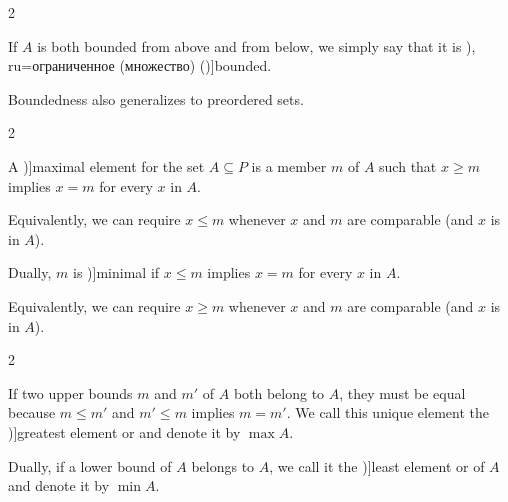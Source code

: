 \begin{definition}
\begin{thmenum}
\begin{paracol}{2}
\begin{rightcolumn}
        If \( A \) is both bounded from above and from below, we simply say that it is \term[bg=ограничено (множество) (\cite[19]{Тагамлицки1971ДиференциалноСмятане}), ru=ограниченное (множество) (\cite[39]{Зорич2019АнализЧасть1})]{bounded}.

        Boundedness also generalizes to preordered sets.
      \end{rightcolumn}
    \end{paracol}

    \begin{paracol}{2}
      \begin{leftcolumn}
        A \term[ru=максимальный (елемент) (\cite[def. 3.6]{Гуров2013ТеорияРешёток})]{maximal element} for the set \( A \subseteq P \) is a member \( m \) of \( A \) such that \( x \geq m \) implies \( x = m \) for every \( x \) in \( A \).

        Equivalently, we can require \( x \leq m \) whenever \( x \) and \( m \) are comparable (and \( x \) is in \( A \)).
      \end{leftcolumn}

      \begin{rightcolumn}
        Dually, \( m \) is \term[ru=минимальный (елемент) (\cite[def. 3.6]{Гуров2013ТеорияРешёток})]{minimal} if \( x \leq m \) implies \( x = m \) for every \( x \) in \( A \).

        Equivalently, we can require \( x \geq m \) whenever \( x \) and \( m \) are comparable (and \( x \) is in \( A \)).
      \end{rightcolumn}
    \end{paracol}

    \begin{paracol}{2}
      \begin{leftcolumn}
        If two upper bounds \( m \) and \( m' \) of \( A \) both belong to \( A \), they must be equal because \( m \leq m' \) and \( m' \leq m \) implies \( m = m' \). We call this unique element the \term[ru=наибольший (елемент) (\cite[def. 3.6]{Гуров2013ТеорияРешёток})]{greatest element} or  and denote it by \( \max A \).
      \end{leftcolumn}

      \begin{rightcolumn}
        Dually, if a lower bound of \( A \) belongs to \( A \), we call it the \term[ru=наименьший (елемент) (\cite[def. 3.6]{Гуров2013ТеорияРешёток})]{least element} or  of \( A \) and denote it by \( \min A \).
      \end{rightcolumn}
    \end{paracol}


\end{thmenum}
\end{definition}
